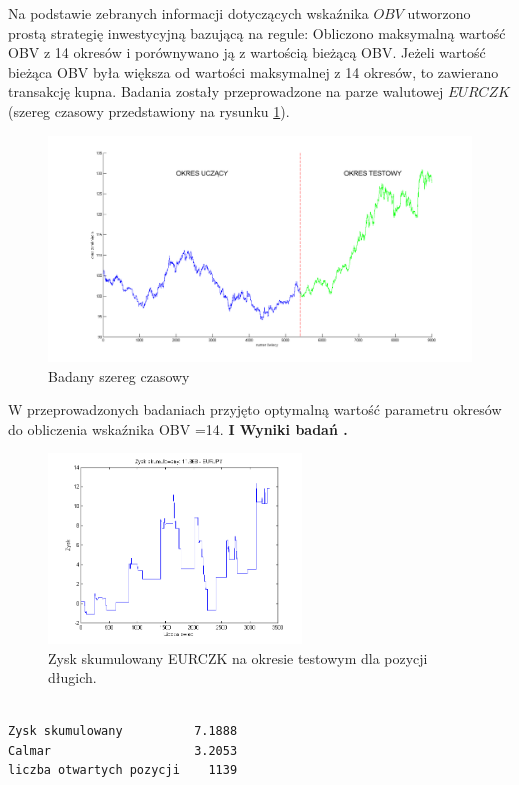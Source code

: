 Na podstawie zebranych informacji dotyczących wskaźnika $OBV$ utworzono prostą strategię inwestycyjną bazującą na regule: Obliczono maksymalną wartość OBV z 14 okresów i porównywano ją z wartością bieżącą OBV. Jeżeli wartość bieżąca OBV była większa od wartości maksymalnej z 14 okresów, to zawierano transakcję kupna. Badania zostały przeprowadzone na parze walutowej $EURCZK$ (szereg czasowy przedstawiony na rysunku \ref{rysunek2}). \\
\begin{figure}[h!]
\centering
\includegraphics[width = \textwidth]{podzialDanych.png}
\caption{Badany szereg czasowy}
\label{rysunek2}
\end{figure}
\FloatBarrier
W przeprowadzonych badaniach przyjęto optymalną wartość parametru okresów do obliczenia wskaźnika OBV =14.
\newpage
\noindent \textbf{I Wyniki badań .}\\
\begin{figure}[h!]
\centering
\includegraphics[width = 0.6\textwidth]{ROC_EURJPY_LS_SearchBestK_zysk.png}
\caption{Zysk skumulowany EURCZK na okresie testowym dla pozycji długich. }
\end{figure}
\FloatBarrier
\begin{verbatim}

Zysk skumulowany          7.1888
Calmar                    3.2053
liczba otwartych pozycji    1139





\end{verbatim}
%
